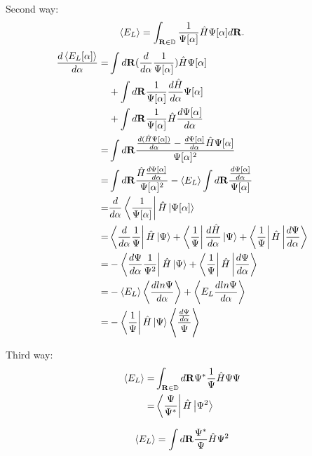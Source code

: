 Second way: 
\begin{equation*}
    \expval{E_L} = \int_{\mathbf{R}\in\mathbb{D}}\frac{1}{\Psi[\alpha]}\hat{H}\Psi[\alpha]d\mathbf{R}. 
\end{equation*}
\begin{equation*}
    \begin{split}
        \frac{d\expval{E_L[\alpha]}}{d\alpha} =& \int d\mathbf{R}(\frac{d}{d\alpha}\frac{1}{\Psi[\alpha]})\hat{H}\Psi[\alpha] \\
        &+ \int d\mathbf{R}\frac{1}{\Psi[\alpha]}\frac{d\hat{H}}{d\alpha}\Psi[\alpha] \\
        &+ \int d\mathbf{R}\frac{1}{\Psi[\alpha]}\hat{H}\frac{d\Psi[\alpha]}{d\alpha} \\
        =& \int d\mathbf{R}\frac{\frac{d(\hat{H}\Psi[\alpha])}{d\alpha}-\frac{d\Psi[\alpha]}{d\alpha}\hat{H}\Psi[\alpha]}{\Psi[\alpha]^2} \\
        =& \int d\mathbf{R}\frac{\hat{H}\frac{d\Psi[\alpha]}{d\alpha}}{\Psi[\alpha]^2} - \expval{E_L}\int d\mathbf{R}\frac{\frac{d\Psi[\alpha]}{d\alpha}}{\Psi[\alpha]} \\
        =& \frac{d}{d\alpha}\bra{\frac{1}{\Psi[\alpha]}}\hat{H}\ket{\Psi[\alpha]} \\
        =& \bra{\frac{d}{d\alpha}\frac{1}{\Psi}}\hat{H}\ket{\Psi} + \bra{\frac{1}{\Psi}}\frac{d\hat{H}}{d\alpha}\ket{\Psi} + \bra{\frac{1}{\Psi}}\hat{H}\ket{\frac{d\Psi}{d\alpha}} \\
        =& -\bra{\frac{d\Psi}{d\alpha}\frac{1}{\Psi^2}}\hat{H}\ket{\Psi} + \bra{\frac{1}{\Psi}}\hat{H}\ket{\frac{d\Psi}{d\alpha}} \\
        =& -\expval{E_L}\expval{\frac{dln\Psi}{d\alpha}} + \expval{E_L\frac{dln\Psi}{d\alpha}} \\
        =& -\bra{\frac{1}{\Psi}}\hat{H}\ket{\Psi}\expval{\frac{\frac{d\Psi}{d\alpha}}{\Psi}}
    \end{split}
\end{equation*}

Third way: 
\begin{equation*}
    \begin{split}
        \expval{E_L} =& \int_{\mathbf{R}\in\mathbb{D}}d\mathbf{R}\Psi^*\frac{1}{\Psi}\hat{H}\Psi\Psi \\
        =& \bra{\frac{\Psi}{\Psi^*}}\hat{H}\ket{\Psi^2} 
    \end{split}
\end{equation*}

\begin{equation*}
    \expval{E_L} = \int d\mathbf{R}\frac{\Psi^*}{\Psi}\hat{H}\Psi^2
\end{equation*}

